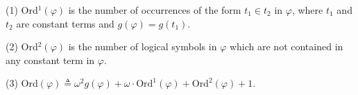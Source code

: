 (1) Ord$^1(\varphi)$ is the number of occurrences of the form $t_1 \in t_2$ in $\varphi$, where $t_1$ and $t_2$ are constant terms and $g(\varphi) = g(t_1)$.

(2) Ord$^2(\varphi)$ is the number of logical symbols in $\varphi$ which are not contained in any constant term in $\varphi$.

(3) Ord$(\varphi) \triangleq \omega^2 g(\varphi) + \omega \cdot \text{Ord}^1(\varphi) + \text{Ord}^2(\varphi) + 1$.
